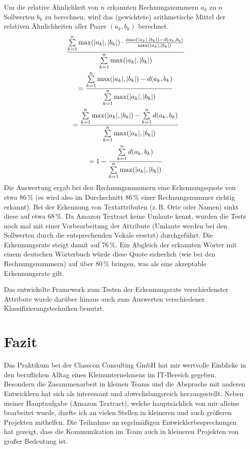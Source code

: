 \documentclass{whswinvcbook}
\begin{document}
Um die relative Ähnlichkeit von $n$ erkannten Rechnungsnummern $a_k$ zu $n$ Sollwerten $b_k$ zu berechnen, wird das (gewichtete) arithmetische Mittel der relativen Ähnlichkeiten aller Paare $(a_k,b_k)$ berechnet.
\begin{gather}
    \frac{\sum\limits_{k=1}^{n}\max(|a_k|,|b_k|)\cdot \frac{\max(|a_k|,|b_k|)-d(a_k,b_b)}{\max(|a_k|,|b_k|)}}{\sum\limits_{k=1}^{n}\max(|a_k|,|b_k|)}\notag\\
    =\frac{\sum\limits_{k=1}^{n}\max(|a_k|,|b_k|)-d(a_k,b_k)}{\sum\limits_{k=1}^{n}\max(|a_k|,|b_k|)}\notag\\
    =\frac{\sum\limits_{k=1}^{n}\max(|a_k|,|b_k|)-\sum\limits_{k=1}^{n}d(a_k,b_k)}{\sum\limits_{k=1}^{n}\max(|a_k|,|b_k|)}\notag\\
    =1-\frac{\sum\limits_{k=1}^{n}d(a_k,b_k)}{\sum\limits_{k=1}^{n}\max(|a_k|,|b_k|)}
\end{gather}
Die Auswertung ergab bei den Rechnungsnummern eine Erkennungsquote von etwa $86\,\%$ (es wird also im Durchschnitt $86\,\%$ einer Rechnungsnummer richtig erkannt). Bei der Erkennung von Textattributen (z.\,B. Orte oder Namen) sinkt diese auf etwa $68\,\%$. Da Amazon Textract keine Umlaute kennt, wurden die Tests noch mal mit einer Vorbearbeitung der Attribute (Umlaute werden bei den Sollwerten durch die entsprechenden Vokale ersetzt) durchgeführt. Die Erkennungsrate steigt damit auf $76\,\%$. Ein Abgleich der erkannten Wörter mit einem deutschen Wörterbuch würde diese Quote sicherlich (wie bei den Rechnungsnummern) auf über $80\,\%$ bringen, was als eine akzeptable Erkennungsrate gilt.

Das entwickelte Framework zum Testen der Erkennungsrate verschiedenster Attribute wurde darüber hinaus auch zum Auswerten verschiedener Klassifizierungstechniken benutzt.
\chapter{Fazit}
Das Praktikum bei der Classcon Consulting GmbH hat mir wertvolle Einblicke in den beruflichen Alltag eines Kleinunternehmens im IT-Bereich gegeben. Besondern die Zusammenarbeit in kleinen Teams und die Absprache mit anderen Entwicklern hat sich als interessant und abwechslungsreich herausgestellt. Neben meiner Hauptaufgabe (Amazon Textract), welche hauptsächlich von mir alleine bearbeitet wurde, durfte ich an vielen Stellen in kleineren und auch größeren Projekten mithelfen. Die Teilnahme an regelmäßigen Entwicklerbesprechungen hat gezeigt, dass die Kommunikation im Team auch in kleineren Projekten von großer Bedeutung ist.
\end{document}
